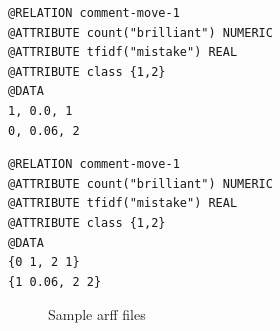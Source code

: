 \documentclass[article,type=msc,colorback,accentcolor=tud7b]{tudthesis}
\begin{document}
    \newsavebox{\complete}
      \begin{lrbox}{\complete}
        \begin{lstlisting}
@RELATION comment-move-1
@ATTRIBUTE count("brilliant") NUMERIC
@ATTRIBUTE tfidf("mistake") REAL
@ATTRIBUTE class {1,2}
@DATA
1, 0.0, 1
0, 0.06, 2	  
        \end{lstlisting}
        \label{fig:sample_arff_file_complete}
      \end{lrbox}
    \newsavebox{\sparse}
      \begin{lrbox}{\sparse}
        \begin{lstlisting}
@RELATION comment-move-1
@ATTRIBUTE count("brilliant") NUMERIC
@ATTRIBUTE tfidf("mistake") REAL
@ATTRIBUTE class {1,2}
@DATA
{0 1, 2 1}
{1 0.06, 2 2}	  
        \end{lstlisting}
        \label{fig:sample_arff_file_sparse}
      \end{lrbox}    
    
    \begin{figure}[H]
	  \centering      
	  \subfloat[complete]{\usebox{\complete}}
	  \quad
	  \subfloat[sparse]{\usebox{\sparse}}
      \caption{Sample arff files}
      \label{fig:sample_arff_files}
	\end{figure}
    
\end{document}
